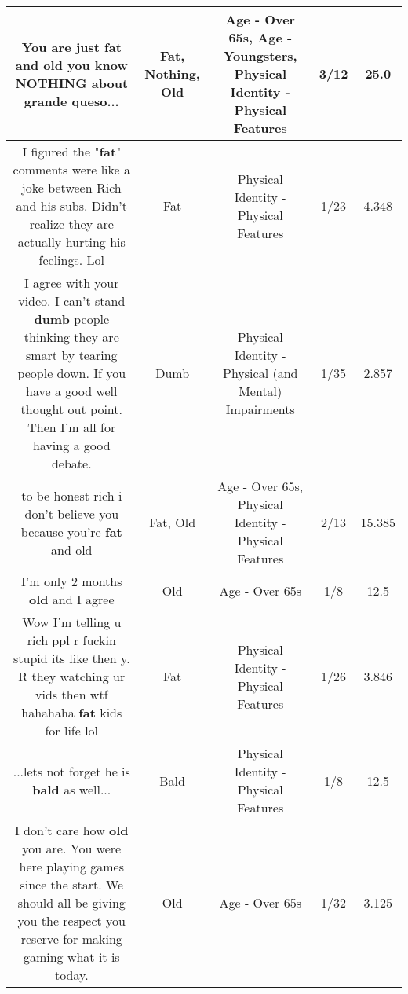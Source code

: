 \documentclass[11pt]{article}
\newlength\mylength
\begin{document}
\begin{center}
\begin{longtable}{|C{.65\mylength}|C{.30\mylength}|C{.12\mylength}|C{.12\mylength}|C{.12\mylength}|}
  \small You are just \textbf{fat} and \textbf{old} you know \textbf{NOTHING} about grande queso...\normalsize   & Fat, Nothing, Old & Age - Over 65s, Age - Youngsters, Physical Identity - Physical Features & 3/12 & 25.0 \\  \hline
  \small I figured the "\textbf{fat}" comments were like a joke between Rich and his subs. Didn't realize they are actually hurting his feelings. Lol\normalsize   & Fat & Physical Identity - Physical Features & 1/23 & 4.348 \\  \hline
  \small I agree with your video. I can't stand \textbf{dumb} people thinking they are smart by tearing people down. If you have a good well thought out point. Then I'm all for having a good debate.\normalsize   & Dumb & Physical Identity - Physical (and Mental) Impairments & 1/35 & 2.857 \\  \hline
  \small to be honest rich i don't believe you because you're \textbf{fat} and old\normalsize   & Fat, Old & Age - Over 65s, Physical Identity - Physical Features & 2/13 & 15.385 \\  \hline
  \small I'm only 2 months \textbf{old} and I agree\normalsize   & Old & Age - Over 65s & 1/8 & 12.5 \\  \hline
  \small Wow I'm telling u rich ppl r fuckin stupid its like then y. R they watching ur vids then wtf hahahaha \textbf{fat} kids for life lol\normalsize   & Fat & Physical Identity - Physical Features & 1/26 & 3.846 \\  \hline
  \small ...lets not forget he is \textbf{bald} as well...\normalsize   & Bald & Physical Identity - Physical Features & 1/8 & 12.5 \\  \hline
  \small I don't care how \textbf{old} you are. You were here playing games since the start. We should all be giving you the respect you reserve for making gaming what it is today.\normalsize   & Old & Age - Over 65s & 1/32 & 3.125 \\  \hline

\end{longtable}
\end{center}
\end{document}
